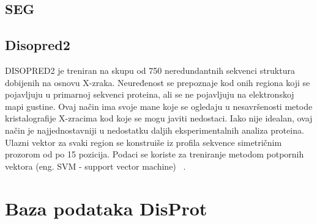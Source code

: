 \subsection{SEG}



\subsection{Disopred2}

DISOPRED2 je treniran na skupu od 750 neredundantnih sekvenci struktura dobijenih na osnovu X-zraka.  Neuređenost se prepoznaje kod onih regiona koji se pojavljuju u primarnoj sekvenci proteina, ali se ne pojavljuju na elektronskoj mapi gustine. Ovaj način ima svoje mane koje se ogledaju u nesavršenosti metode kristalografije X-zracima kod koje se mogu javiti nedostaci. Iako nije idealan, ovaj način je najjednostavniji u nedostatku daljih eksperimentalnih analiza proteina. Ulazni vektor za svaki region se konstruiše iz profila sekvence simetričnim prozorom od po 15 pozicija. Podaci se koriste za treniranje  metodom potpornih vektora (eng. SVM - support vector machine) ~\cite{DISOPRED}.


\section{Baza podataka DisProt}


